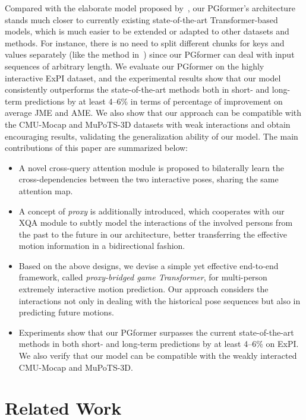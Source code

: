 \documentclass[10pt,twocolumn,letterpaper]{article}
\begin{document}
Compared with the elaborate model proposed by~\cite{guo2021multi}, our PGformer's architecture stands much closer to currently existing state-of-the-art Transformer-based models, which is much easier to be extended or adapted to other datasets and methods. 
For instance, there is no need to split different chunks for keys and values separately (like the method in~\cite{guo2021multi}) since our PGformer can deal with input sequences of arbitrary length. 
We evaluate our PGformer on the highly interactive ExPI dataset, and the experimental results show that our model consistently outperforms the state-of-the-art methods both in short- and long-term predictions by at least 4--6\% in terms of percentage of improvement on average JME and AME.
We also show that our approach can be compatible with the CMU-Mocap and MuPoTS-3D datasets with weak interactions and obtain encouraging results, validating the generalization ability of our model. 
The main contributions of this paper are summarized below: 
\begin{itemize}
    \vspace{-0.4em}
    \item A novel cross-query attention module is proposed to bilaterally learn the cross-dependencies between the two interactive poses, sharing the same attention map. 
\item A concept of \textit{proxy} is additionally introduced, which cooperates with our XQA module to subtly model the interactions of the involved persons from the past to the future in our architecture, better transferring the effective motion information in a bidirectional fashion. 
\vspace{-0.4em}
    \item Based on the above designs, we devise a simple yet effective end-to-end framework, called \textit{proxy-bridged game Transformer}, for multi-person extremely interactive motion prediction. 
    Our approach considers the interactions not only in dealing with the historical pose sequences but also in predicting future motions.
\vspace{-0.4em}
    \item Experiments show that our PGformer surpasses the current state-of-the-art methods in both short- and long-term predictions by at least 4--6\% on ExPI. 
    We also verify that our model can be compatible with the weakly interacted CMU-Mocap and MuPoTS-3D.  
\end{itemize}

\section{Related Work}
\end{document}
